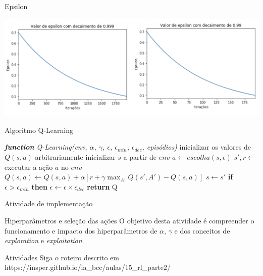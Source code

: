 \documentclass{beamer}
\begin{document}
\begin{frame}{Epsilon}
	  \begin{center}
		\includegraphics[width=\textwidth]{figuras/epsilon.png}
	\end{center}
\end{frame}

\begin{frame}{Algoritmo Q-Learning}
	
\begin{algorithmic} 
	\STATE \emph{\textbf{function} Q-Learning(env, $\alpha$, $\gamma$, $\epsilon$, $\epsilon_{min}$, $\epsilon_{dec}$, episódios)}
	\STATE inicializar os valores de $Q(s, a)$ arbitrariamente
	\STATE inicializar $s$ a partir de $env$
	\REPEAT
	\STATE $a \leftarrow escolha(s, \epsilon)$
	\STATE $s', r \leftarrow$ executar a ação $a$ no $env$
	\STATE $Q(s,a) \leftarrow Q(s,a) + \alpha [r +\gamma \max_{A'}{Q(s', A')} - Q(s,a)]$
	\STATE$s  \leftarrow s'$
	\STATE \textbf{if} $\epsilon > \epsilon_{min}$ \textbf{then} $\epsilon \leftarrow \epsilon \times \epsilon_{dec}$
	\ENDFOR
	\STATE \textbf{return} Q
\end{algorithmic}	
\end{frame}

\begin{frame}{Atividade de implementação}
		
	\begin{alertblock}{Hiperparâmetros e seleção das ações}
		O objetivo desta atividade é compreender o funcionamento e impacto dos hiperparâmetros de $\alpha$, $\gamma$ e dos conceitos de \textit{exploration} e \textit{exploitation}.
	\end{alertblock}
	
	\begin{block}{Atividades}
		Siga o roteiro descrito em https://insper.github.io/ia\_bcc/aulas/15\_rl\_parte2/ \href{https://insper.github.io/ia_bcc/aulas/15_rl_parte2/}
		{}
	\end{block}

\end{frame}
\end{document}
